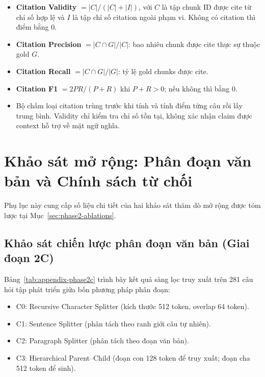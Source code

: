 \begin{itemize}
  \item \textbf{Citation Validity} $= |C|/(|C|+|I|)$, với $C$ là tập chunk ID
  được cite từ chỉ số hợp lệ và $I$ là tập chỉ số citation ngoài phạm vi.
  Không có citation thì điểm bằng 0.
  \item \textbf{Citation Precision} $=|C\cap G|/|C|$: bao nhiêu chunk được
  cite thực sự thuộc gold $G$.
  \item \textbf{Citation Recall} $=|C\cap G|/|G|$: tỷ lệ gold chunks được cite.
  \item \textbf{Citation F1} $=2PR/(P+R)$ khi $P+R>0$; nếu không thì bằng 0.
  \item Bộ chấm loại citation trùng trước khi tính và tính điểm từng câu rồi
  lấy trung bình. Validity chỉ kiểm tra chỉ số tồn tại, không xác nhận claim
  được context hỗ trợ về mặt ngữ nghĩa.
\end{itemize}

\section{Khảo sát mở rộng: Phân đoạn văn bản và Chính sách từ chối}
\label{sec:appendix-ablations}

Phụ lục này cung cấp số liệu chi tiết của hai khảo sát thăm dò mở rộng được tóm lược tại Mục~\ref{sec:phase2-ablations}.

\subsection{Khảo sát chiến lược phân đoạn văn bản (Giai đoạn 2C)}
Bảng~\ref{tab:appendix-phase2c} trình bày kết quả sàng lọc truy xuất trên 281 câu hỏi tập phát triển giữa bốn phương pháp phân đoạn:
\begin{itemize}
  \item C0: Recursive Character Splitter (kích thước 512 token, overlap 64 token).
  \item C1: Sentence Splitter (phân tách theo ranh giới câu tự nhiên).
  \item C2: Paragraph Splitter (phân tách theo đoạn văn bản).
  \item C3: Hierarchical Parent--Child (đoạn con 128 token để truy xuất; đoạn cha 512 token để sinh).
\end{itemize}


